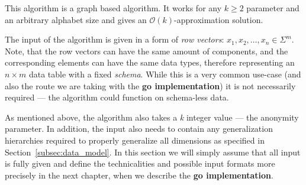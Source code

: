 This algorithm is a graph based algorithm.
It works for any \(k\ge2\) parameter and an arbitrary alphabet size and gives an \(\mathcal{O}(k)\)-approximation solution.

The input of the algorithm is given in a form of \textit{row vectors}: \(x_1, x_2, \dots, x_n \in \Sigma^m\).
Note, that the row vectors can have the same amount of components, and the corresponding elements can have the same data types, therefore representing an \(n \times m\) data table with a fixed \textit{schema}.
While this is a very common use-case (and also the route we are taking with the \textbf{go implementation}) it is not necessarily required --- the algorithm could function on schema-less data.

As mentioned above, the algorithm also takes a \textit{k} integer value --- the anonymity parameter.
In addition, the input also needs to contain any generalization hierarchies required to properly generalize all dimensions as specified in Section~\ref{subsec:data_model}.
In this section we will simply assume that all input is fully given and define the technicalities and possible input formats more precisely in the next chapter, when we describe the \textbf{go implementation}.
